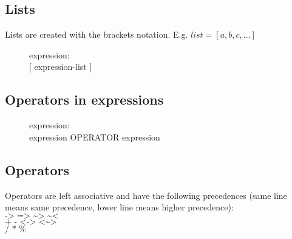 \subsection{Lists}
Lists are created with the brackets notation. E.g. $list = [a, b, c, ...]$
\begin{description}
  \item[]expression: \hfill \\
    $[$ expression-list $]$
\end{description}

\subsection{Operators in expressions}
\begin{description}
  \item[]expression: \hfill \\
    expression OPERATOR expression
\end{description}

\subsection{Operators}
Operators are left associative and have the following precedences (same line
means same precedence, lower line means higher precedence):\\
$\texttt{-> => \textasciitilde> \textasciitilde<}$\\
$\texttt{+ - <-> <\textasciitilde>}$\\
$\texttt{/ * \%}$

